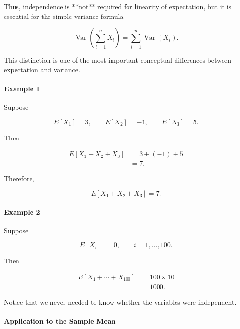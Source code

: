 \documentclass[11pt]{article}
\begin{document}
\begin{mdframed}[
		linewidth=0.8pt,
		roundcorner=6pt,
		backgroundcolor=gray!5,
		linecolor=gray!60,
		innertopmargin=10pt,
		innerbottommargin=10pt,
		innerleftmargin=10pt,
		innerrightmargin=10pt
		]
		Thus, independence is **not** required for linearity of expectation, but it
		is essential for the simple variance formula
		
		\[
		\boxed{
			\operatorname{Var}
			\!\left(
			\sum_{i=1}^{n}X_i
			\right)
			=
			\sum_{i=1}^{n}\operatorname{Var}(X_i).
		}
		\]
		
		This distinction is one of the most important conceptual differences between
		expectation and variance.
		
		\bigskip
		
		\paragraph{Example 1}
		
		Suppose
		
		\[
		E[X_1]=3,
		\qquad
		E[X_2]=-1,
		\qquad
		E[X_3]=5.
		\]
		
		Then
		
		\[
		\begin{aligned}
			E[X_1+X_2+X_3]
			&=
			3
			+
			(-1)
			+
			5
			\\[0.3cm]
			&=
			7.
		\end{aligned}
		\]
		
		Therefore,
		
		\[
		\boxed{
			E[X_1+X_2+X_3]=7.
		}
		\]
		
		\bigskip
		
		\paragraph{Example 2}
		
		Suppose
		
		\[
		E[X_i]=10,
		\qquad
		i=1,\ldots,100.
		\]
		
		Then
		
		\[
		\begin{aligned}
			E[X_1+\cdots+X_{100}]
			&=
			100\times10
			\\[0.3cm]
			&=
			1000.
		\end{aligned}
		\]
		
		Notice that we never needed to know whether the variables were
		independent.
		
		\bigskip
		
		\paragraph{Application to the Sample Mean}
		

\end{mdframed}
\end{document}
